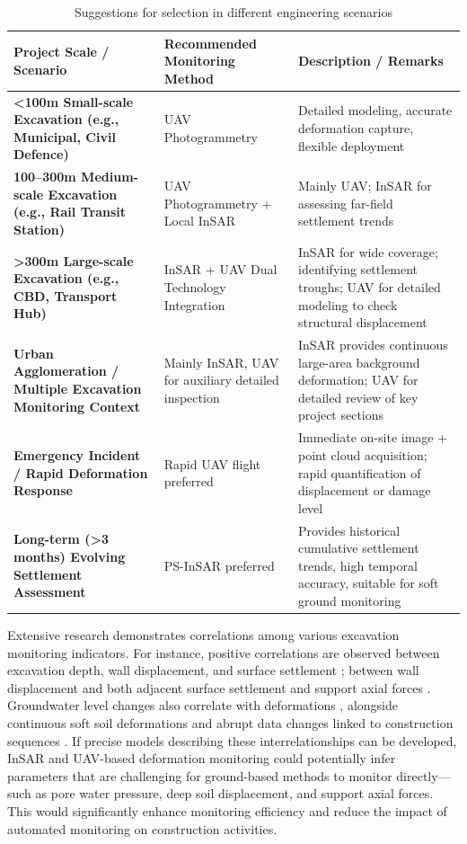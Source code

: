 \documentclass[preprint,11pt,authoryear,3p]{elsarticle}
\begin{document}
\begin{table}[h]
    \centering
    \caption{Suggestions for selection in different engineering scenarios}
    \label{tab:monitoringSelection}
    \renewcommand{\arraystretch}{1.3}
    \begin{tabular}{p{6cm}p{4cm}p{6.5cm}}
        \toprule
        \textbf{Project Scale / Scenario} & \textbf{Recommended Monitoring Method} & \textbf{Description / Remarks} \\ 
        \midrule
        \textbf{<100m Small-scale Excavation (e.g., Municipal, Civil Defence)} & UAV Photogrammetry & Detailed modeling, accurate deformation capture, flexible deployment \\
        \textbf{100--300m Medium-scale Excavation (e.g., Rail Transit Station)} & UAV Photogrammetry + Local InSAR & Mainly UAV; InSAR for assessing far-field settlement trends \\
        \textbf{>300m Large-scale Excavation (e.g., CBD, Transport Hub)} & InSAR + UAV Dual Technology Integration & InSAR for wide coverage; identifying settlement troughs; UAV for detailed modeling to check structural displacement \\
        \textbf{Urban Agglomeration / Multiple Excavation Monitoring Context} & Mainly InSAR, UAV for auxiliary detailed inspection & InSAR provides continuous large-area background deformation; UAV for detailed review of key project sections \\
        \textbf{Emergency Incident / Rapid Deformation Response} & Rapid UAV flight preferred & Immediate on-site image + point cloud acquisition; rapid quantification of displacement or damage level \\
        \textbf{Long-term (>3 months) Evolving Settlement Assessment} & PS-InSAR preferred & Provides historical cumulative settlement trends, high temporal accuracy, suitable for soft ground monitoring \\
        \bottomrule
    \end{tabular}
\end{table}

Extensive research demonstrates correlations among various excavation monitoring indicators. For instance, positive correlations are observed between excavation depth, wall displacement, and surface settlement \citep{Ou2000DeepExcavation}; between wall displacement and both adjacent surface settlement \citep{Long2001DatabaseSupportedExcavations} and support axial forces \citep{Clough1989ConstructionInduced}. Groundwater level changes also correlate with deformations \citep{Finno2007ObservedPerformanceStruttedExcavation}, alongside continuous soft soil deformations \citep{Peck1969DeepExcavations} and abrupt data changes linked to construction sequences \citep{HE2020315}. If precise models describing these interrelationships can be developed, InSAR and UAV-based deformation monitoring could potentially infer parameters that are challenging for ground-based methods to monitor directly—such as pore water pressure, deep soil displacement, and support axial forces. This would significantly enhance monitoring efficiency and reduce the impact of automated monitoring on construction activities.
\end{document}
